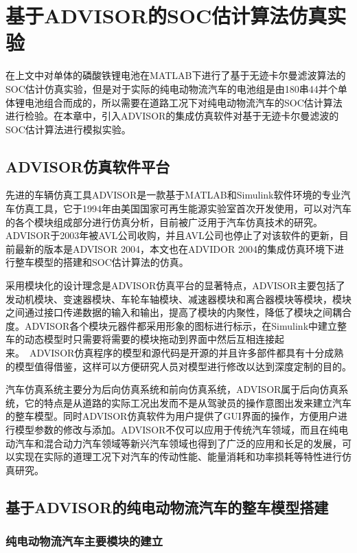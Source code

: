 
\chapter{基于ADVISOR的SOC估计算法仿真实验}
在上文中对单体的磷酸铁锂电池在MATLAB下进行了基于无迹卡尔曼滤波算法的SOC估计仿真实验，但是对于实际的纯电动物流汽车的电池组是由180串44并个单体锂电池组合而成的，所以需要在道路工况下对纯电动物流汽车的SOC估计算法进行检验。在本章中，引入ADVISOR的集成仿真软件对基于无迹卡尔曼滤波的SOC估计算法进行模拟实验。
\section{ADVISOR仿真软件平台}
先进的车辆仿真工具ADVISOR是一款基于MATLAB和Simulink软件环境的专业汽车仿真工具，它于1994年由美国国家可再生能源实验室首次开发使用，可以对汽车的各个模块组成部分进行仿真分析，目前被广泛用于汽车仿真技术的研究。ADVISOR于2003年被AVL公司收购，并且AVL公司也停止了对该软件的更新，目前最新的版本是ADVISOR 2004，本文也在ADVIDOR 2004的集成仿真环境下进行整车模型的搭建和SOC估计算法的仿真。

采用模块化的设计理念是ADVISOR仿真平台的显著特点，ADVISOR主要包括了发动机模块、变速器模块、车轮车轴模块、减速器模块和离合器模块等模块，模块之间通过接口传递数据的输入和输出，提高了模块的内聚性，降低了模块之间耦合度。ADVISOR各个模块元器件都采用形象的图标进行标示，在Simulink中建立整车的动态模型时只需要将需要的模块拖动到界面中然后互相连接起来。\ ADVISOR仿真程序的模型和源代码是开源的并且许多部件都具有十分成熟的模型值得借鉴，这样可以方便研究人员对模型进行修改以达到深度定制的目的。

汽车仿真系统主要分为后向仿真系统和前向仿真系统，ADVISOR属于后向仿真系统，它的特点是从道路的实际工况出发而不是从驾驶员的操作意图出发来建立汽车的整车模型。同时ADVISOR仿真软件为用户提供了GUI界面的操作，方便用户进行模型参数的修改与添加。ADVISOR不仅可以应用于传统汽车领域，而且在纯电动汽车和混合动力汽车领域等新兴汽车领域也得到了广泛的应用和长足的发展，可以实现在实际的道理工况下对汽车的传动性能、能量消耗和功率损耗等特性进行仿真研究。
\section{基于ADVISOR的纯电动物流汽车的整车模型搭建}
\subsection{纯电动物流汽车主要模块的建立}

